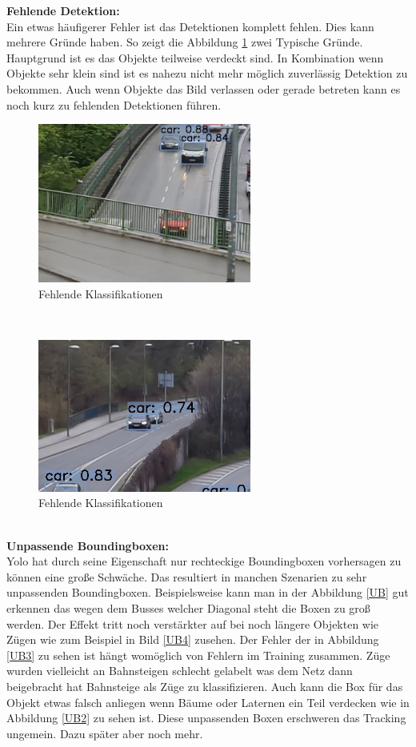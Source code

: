 \documentclass[conference]{IEEEtran}
\begin{document}
	\textbf{Fehlende Detektion:}\\
	Ein etwas häufigerer Fehler ist das Detektionen komplett fehlen. Dies kann mehrere Gründe haben. So zeigt die Abbildung \ref{FeK} zwei Typische Gründe. Hauptgrund ist es das Objekte teilweise verdeckt sind. In Kombination wenn Objekte sehr klein sind ist es nahezu nicht mehr möglich zuverlässig Detektion zu bekommen. Auch wenn Objekte das Bild verlassen oder gerade betreten kann es noch kurz zu fehlenden Detektionen führen.
	\begin{figure}[!h]
		\begin{center}
			\includegraphics[width=7cm]{Media/Output_680 - Kopie.jpg}
			\caption{Fehlende Klassifikationen}
			\label{FeK}
		\end{center}
	\end{figure}\\
	\begin{figure}[!h]
		\begin{center}
			\includegraphics[width=7cm]{Media/Output_108 - Kopie.jpg}
			\caption{Fehlende Klassifikationen}
			\label{FeK2}
		\end{center}
	\end{figure}\\
	\textbf{Unpassende Boundingboxen:}\\
	Yolo hat durch seine Eigenschaft nur rechteckige Boundingboxen vorhersagen zu können eine große Schwäche. Das resultiert in manchen Szenarien zu sehr unpassenden Boundingboxen. Beispielsweise kann man in der Abbildung \ref{UB} gut erkennen das wegen dem Busses welcher Diagonal steht die Boxen zu groß werden. Der Effekt tritt noch verstärkter auf bei noch längere Objekten wie Zügen wie zum Beispiel in Bild \ref{UB4} zusehen. Der Fehler der in Abbildung \ref{UB3} zu sehen ist hängt womöglich von Fehlern im Training zusammen. Züge wurden vielleicht an Bahnsteigen schlecht gelabelt was dem Netz dann beigebracht hat Bahnsteige als Züge zu klassifizieren. Auch kann die Box für das Objekt etwas falsch anliegen wenn Bäume oder Laternen ein Teil verdecken wie in Abbildung \ref{UB2} zu sehen ist. Diese unpassenden Boxen erschweren das Tracking ungemein. Dazu später aber noch mehr. 
\end{document}
